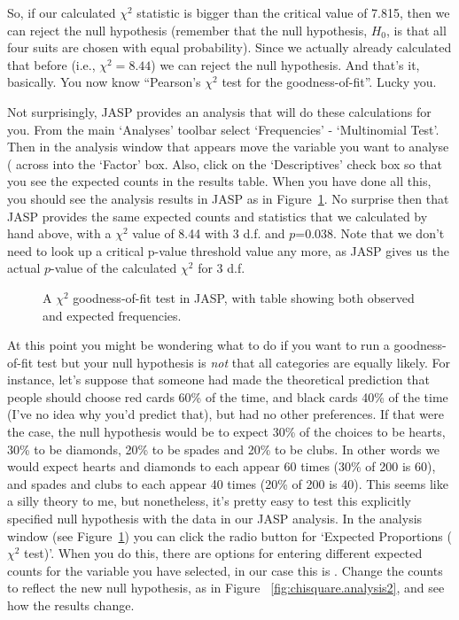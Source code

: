 So, if our calculated $\chi^2$ statistic is bigger than the critical value of 7.815, then we can reject the null hypothesis (remember that the null hypothesis, $H_0$, is that all four suits are chosen with equal probability). Since we actually already calculated that before (i.e., $\chi^2 = 8.44$) we can reject the null hypothesis.  And that's it, basically. You now know ``Pearson's $\chi^2$ test for the goodness-of-fit''. Lucky you.


Not surprisingly, JASP provides an analysis that will do these calculations for you. From the main `Analyses' toolbar select `Frequencies' - `Multinomial Test'. Then in the analysis window that appears move the variable you want to analyse ( across into the `Factor' box. Also, click on the `Descriptives' check box so that you see the expected counts in the results table. When you have done all this, you should see the analysis results in JASP as in Figure~\ref{fig:chisquare.analysis1}. No surprise then that JASP provides the same expected counts and statistics that we calculated by hand above, with a $\chi^2$ value of 8.44 with 3 d.f. and $p$=0.038. Note that we don't need to look up a critical p-value threshold value any more, as JASP gives us the actual $p$-value of the calculated $\chi^2$ for 3 d.f.  

\begin{figure}
\begin{center}
\caption{A $\chi^2$ goodness-of-fit test in JASP, with table showing both observed and expected frequencies.}
\label{fig:chisquare.analysis1}
\HR
\end{center}
\end{figure}


At this point you might be wondering what to do if you want to run a goodness-of-fit test but your null hypothesis is {\it not} that all categories are equally likely. For instance, let's suppose that someone had made the theoretical prediction that people should choose red cards 60\% of the time, and black cards 40\% of the time (I've no idea why you'd predict that), but had no other preferences. If that were the case, the null hypothesis would be to expect 30\% of the choices to be hearts, 30\% to be diamonds, 20\% to be spades and 20\% to be clubs. In other words we would expect hearts and diamonds to each appear 60 times (30\% of 200 is 60), and spades and clubs to each appear 40 times (20\% of 200 is 40). This seems like a silly theory to me, but nonetheless, it's pretty easy to test this explicitly specified null hypothesis with the data in our JASP analysis. In the analysis window (see Figure~\ref{fig:chisquare.analysis1}) you can click the radio button for `Expected Proportions ($\chi^2$ test)'. When you do this, there are options for entering different expected counts for the variable you have selected, in our case this is . Change the counts to reflect the new null hypothesis, as in Figure~ \ref{fig:chisquare.analysis2}, and see how the results change. 

